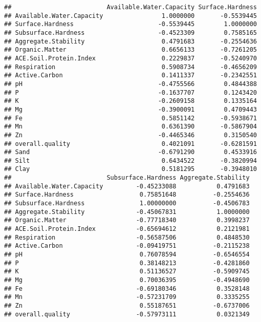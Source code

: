 \documentclass[]{article}
\begin{document}
\begin{verbatim}
##                          Available.Water.Capacity Surface.Hardness
## Available.Water.Capacity                1.0000000       -0.5539445
## Surface.Hardness                       -0.5539445        1.0000000
## Subsurface.Hardness                    -0.4523309        0.7585165
## Aggregate.Stability                     0.4791683       -0.2554636
## Organic.Matter                          0.6656133       -0.7261205
## ACE.Soil.Protein.Index                  0.2229837       -0.5240970
## Respiration                             0.5908734       -0.4656209
## Active.Carbon                           0.1411337       -0.2342551
## pH                                     -0.4755566        0.4844388
## P                                      -0.1637707        0.1243420
## K                                      -0.2609158        0.1335164
## Mg                                     -0.3900091        0.4709443
## Fe                                      0.5851142       -0.5938671
## Mn                                      0.6361390       -0.5867904
## Zn                                     -0.4465346        0.3150540
## overall.quality                         0.4021091       -0.6281591
## Sand                                   -0.6791290        0.4533916
## Silt                                    0.6434522       -0.3820994
## Clay                                    0.5181295       -0.3948010
##                          Subsurface.Hardness Aggregate.Stability
## Available.Water.Capacity         -0.45233088           0.4791683
## Surface.Hardness                  0.75851648          -0.2554636
## Subsurface.Hardness               1.00000000          -0.4506783
## Aggregate.Stability              -0.45067831           1.0000000
## Organic.Matter                   -0.77718340           0.3998237
## ACE.Soil.Protein.Index           -0.65694612           0.2121981
## Respiration                      -0.56587506           0.4848530
## Active.Carbon                    -0.09419751          -0.2115238
## pH                                0.76078594          -0.6546554
## P                                 0.38148213          -0.4281860
## K                                 0.51136527          -0.5909745
## Mg                                0.70036395          -0.4948690
## Fe                               -0.69180346           0.3528148
## Mn                               -0.57231709           0.3335255
## Zn                                0.55187651          -0.6737006
## overall.quality                  -0.57973111           0.0321349

\end{verbatim}
\end{document}
